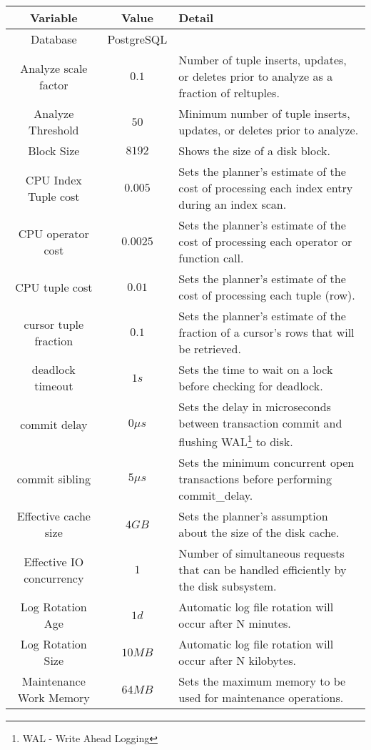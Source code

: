 \documentclass[paper=letter, fontsize=12pt]{article}
\begin{document}
	\renewcommand{\arraystretch}{2} %
	\begin{longtable}{c | c | p{9cm} }
		Variable & Value & Detail
		\\ \hline
		Database & PostgreSQL & 
		\\ \hline
		Analyze scale factor & $0.1$ & Number of tuple inserts, updates, or deletes prior to analyze as a fraction of reltuples.
		\\ \hline
		Analyze Threshold & $50$ & Minimum number of tuple inserts, updates, or deletes prior to analyze.
		\\ \hline
		Block Size & $8192$ & Shows the size of a disk block.
		\\ \hline
		CPU Index Tuple cost & $0.005$ & Sets the planner's estimate of the cost of processing each index entry during an index scan.
		\\ \hline
		CPU operator cost & $0.0025$ & Sets the planner's estimate of the cost of processing each operator or function call.
		\\ \hline
		CPU tuple cost & $0.01$ & Sets the planner's estimate of the cost of processing each tuple (row).
		\\ \hline
		cursor tuple fraction & $0.1$ & Sets the planner's estimate of the fraction of a cursor's rows that will be retrieved.
		\\ \hline
		deadlock timeout & $1s$ & Sets the time to wait on a lock before checking for deadlock.
		\\ \hline
		commit delay & $0\mu s$ & Sets the delay in microseconds between transaction commit and flushing WAL\footnote{WAL - Write Ahead Logging} to disk.
		\\ \hline
		commit sibling & $5\mu s$ & Sets the minimum concurrent open transactions before performing commit\_delay.
		\\ \hline
		Effective cache size & $4GB$ & Sets the planner's assumption about the size of the disk cache.
		\\ \hline
		Effective IO concurrency & $1$ & Number of simultaneous requests that can be handled efficiently by the disk subsystem.
		\\ \hline
		Log Rotation Age & $1d$ & Automatic log file rotation will occur after N minutes.
		\\ \hline
		Log Rotation Size & $10MB$ & Automatic log file rotation will occur after N kilobytes.
		\\ \hline
		Maintenance Work Memory & $64MB$ & Sets the maximum memory to be used for maintenance operations.

\end{longtable}
\end{document}
